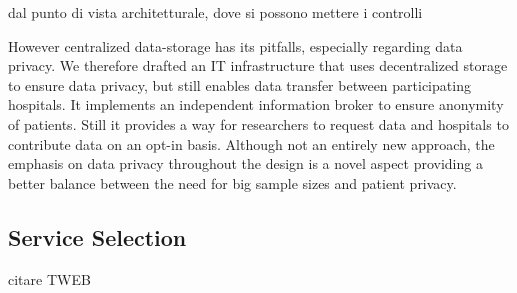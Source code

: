 \cite{10.1007/978-3-642-10665-1_11} dal punto di vista architetturale, dove si possono mettere i controlli

\cite{balancingInMedicine} However centralized data-storage has its pitfalls, especially regarding data privacy. We therefore drafted an IT infrastructure that uses decentralized storage to ensure data privacy, but still enables data transfer between participating hospitals. It implements an independent information broker to ensure anonymity of patients. Still it provides a way for researchers to request data and hospitals to contribute data on an opt-in basis. Although not an entirely new approach, the emphasis on data privacy throughout the design is a novel aspect providing a better balance between the need for big sample sizes and patient privacy. 

\subsection{Service Selection} 
citare TWEB
